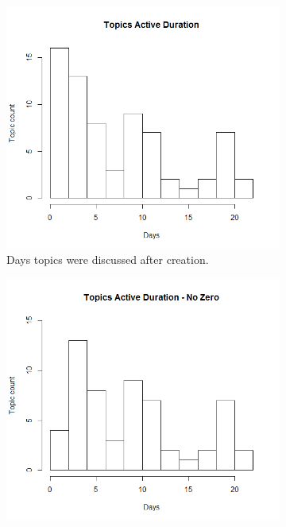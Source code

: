    \begin{figure}
    \centering
      \begin{subfigure}[b]{0.4\textwidth}
        \includegraphics[width=\textwidth]{topic_days_active.png}
        \caption{Days topics were discussed after creation.}
      \end{subfigure}
      \begin{subfigure}[b]{0.4\textwidth}
        \includegraphics[width=\textwidth]{topic_days_active_nz.png}

\end{subfigure}
\end{figure}
